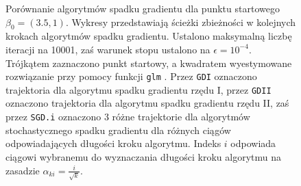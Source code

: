 \begin{figure}[hbt!]
  \caption[Porównanie algorytmów spadku gradientu dla punktu startowego $\beta_0 = (3.5,1)$.]{\label{fig:sc3asd}Porównanie algorytmów spadku gradientu dla punktu startowego $\beta_0 = (3.5,1)$. Wykresy przedstawiają ścieżki zbieżności w kolejnych krokach algorytmów spadku gradientu. Ustalono maksymalną liczbę iteracji na 10001, zaś warunek stopu ustalono na $\epsilon=10^{-4}$. Trójkątem zaznaczono punkt startowy, a kwadratem wyestymowane rozwiązanie przy pomocy funkcji \texttt{glm} \cite{glmglm}. Przez \texttt{GDI} oznaczono trajektoria dla algorytmu spadku gradientu rzędu I, przez \texttt{GDII} oznaczono trajektoria dla algorytmu spadku gradientu rzędu II, zaś przez \texttt{SGD.i} oznaczono 3 różne trajektorie dla algorytmów stochastycznego spadku gradientu dla różnych ciągów odpowiadających długości kroku algorytmu. Indeks $i$ odpowiada ciągowi wybranemu do wyznaczania długości kroku algorytmu na zasadzie $\alpha_{ki} = \frac{i}{\sqrt{k}}$.}
\end{figure}


